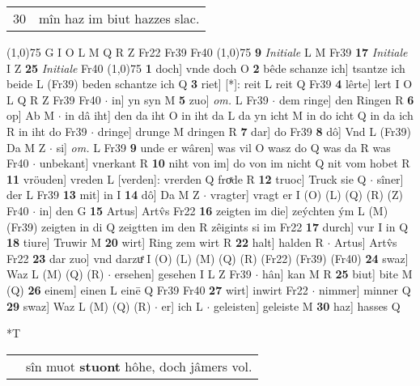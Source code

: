 \documentclass[8pt,a4paper,notitlepage]{article}
\begin{document}
\begin{table}[ht]
\begin{minipage}[t]{0.5\linewidth}
\begin{tabular}{rl}
30 & mîn haz im biut hazzes slac.\\ 
\end{tabular}
\scriptsize
\line(1,0){75} \newline
G I O L M Q R Z Fr22 Fr39 Fr40 \newline
\line(1,0){75} \newline
\textbf{9} \textit{Initiale} L M Fr39  \textbf{17} \textit{Initiale} I Z  \textbf{25} \textit{Initiale} Fr40  \newline
\line(1,0){75} \newline
\textbf{1} doch] vnde doch O \textbf{2} bêde schanze ich] tsantze ich beide L (Fr39) beden schantze ich Q \textbf{3} riet] [*]: reit L reit Q Fr39 \textbf{4} lêrte] lert I O L Q R Z Fr39 Fr40  $\cdot$ in] yn syn M \textbf{5} zuo] \textit{om.} L Fr39  $\cdot$ dem ringe] den Ringen R \textbf{6} op] Ab M  $\cdot$ in dâ iht] den da iht O in iht da L da yn icht M in do icht Q in da ich R in iht do Fr39  $\cdot$ dringe] drunge M dringen R \textbf{7} dar] do Fr39 \textbf{8} dô] Vnd L (Fr39) Da M Z  $\cdot$ si] \textit{om.} L Fr39 \textbf{9} unde er wâren] was vil O wasz do Q was da R was Fr40  $\cdot$ unbekant] vnerkant R \textbf{10} niht von im] do von im nicht Q nit vom hobet R \textbf{11} vröuden] vreden L [verden]: vrerden Q froͯde R \textbf{12} truoc] Truck sie Q  $\cdot$ sîner] der L Fr39 \textbf{13} mit] in I \textbf{14} dô] Da M Z  $\cdot$ vragter] vragt er I (O) (L) (Q) (R) (Z) Fr40  $\cdot$ in] den G \textbf{15} Artus] Artv̂s Fr22 \textbf{16} zeigten im die] zeýchten ým L (M) (Fr39) zeigten in di Q zeigtten im den R zêigints si im Fr22 \textbf{17} durch] vur I in Q \textbf{18} tiure] Truwir M \textbf{20} wirt] Ring zem wirt R \textbf{22} halt] halden R  $\cdot$ Artus] Artv̂s Fr22 \textbf{23} dar zuo] vnd darzuͤ I (O) (L) (M) (Q) (R) (Fr22) (Fr39) (Fr40) \textbf{24} swaz] Waz L (M) (Q) (R)  $\cdot$ ersehen] gesehen I L Z Fr39  $\cdot$ hân] kan M R \textbf{25} biut] bite M (Q) \textbf{26} einem] einen L einē Q Fr39 Fr40 \textbf{27} wirt] inwirt Fr22  $\cdot$ nimmer] minner Q \textbf{29} swaz] Waz L (M) (Q) (R)  $\cdot$ er] ich L  $\cdot$ geleisten] geleiste M \textbf{30} haz] hasses Q \newline
\end{minipage}
\hspace{0.5cm}
\begin{minipage}[t]{0.5\linewidth}
\small
\begin{center}*T
\end{center}
\begin{tabular}{rl}
 & sîn muot \textbf{stuont} hôhe, doch jâmers vol.\\ 

\end{tabular}
\end{minipage}
\end{table}
\end{document}

